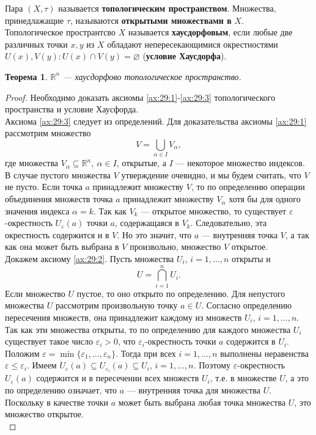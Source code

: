 \documentclass[12pt]{report}
\numberwithin{equation}{section}
\newtheorem{theorem}{Теорема}[section]
\begin{document}
Пара $(X, \tau)$ называется \textbf{топологическим пространством}. Множества, принедлажащие $\tau$, называются \textbf{открытыми множествами в} $X$.\\

Топологическое пространтсво $X$ называется \textbf{хаусдорфовым}, если любые две различных точки $x, y$ из $X$ обладают непересекающимися окрестностями $U(x),V(y): U(x) \cap V(y) = \varnothing$ (\textbf{условие Хаусдорфа}).

\begin{theorem} \label{th:29:1}
$\mathbb{R}^n$ --- хаусдорфово топологическое пространство.
\end{theorem}
\begin{proof}
Необходимо доказать аксиомы \ref{ax:29:1}-\ref{ax:29:3} топологического пространства и условие Хаусфорда.\\

Аксиома \ref{ax:29:3} следует из определений. Для доказательства аксиомы \ref{ax:29:1} рассмотрим множество
\[ V = \bigcup\limits_{\alpha \in I} V_{\alpha},\]
где множества $V_{\alpha} \subseteq \mathbb{R}^n,~\alpha \in I$, открытые, а $I$ --- некоторое множество индексов. В случае пустого множества $V$ утверждение очевидно, и мы будем считать, что $V$ не пусто. Если точка $a$ принадлежит множеству $V$, то по определению операции объединения множеств точка $a$ принадлежит множеству $V_{\alpha}$ хотя бы для одного значения индекса $\alpha = k$. Так как $V_k$ --- открытое множество, то существует $\varepsilon$-окрестность $U_{\varepsilon}(a)$ точки $a$, содержащаяся в $V_k$. Следовательно, эта окрестность содержится и в $V$. Но это значит, что $a$ --- внутренняя точка $V$, а так как она может быть выбрана в $V$ произвольно, множество $V$ открытое.\\

Докажем аксиому \ref{ax:29:2}. Пусть множества $U_i$, $i = 1, \ldots, n$ открыты и
\[ U = \bigcap\limits_{i = 1}^n U_i.\]
Если множество $U$ пустое, то оно открыто по определению. Для непустого множества $U$ рассмотрим произвольную точку $a \in U$. Согласно определению пересечения множеств, она принадлежит каждому из множеств $U_i$, $i = 1, \ldots, n$. Так как эти множества открыты, то по определению для каждого множества $U_i$ существует такое число $\varepsilon_i > 0$, что $\varepsilon_i$-окрестность точки $a$ содержится в $U_i$. Положим $\varepsilon = \min \{ \varepsilon_1, \ldots, \varepsilon_n \} $. Тогда при всех $i = 1, \ldots, n$ выполнены неравенства $\varepsilon \leqslant \varepsilon_i$. Имеем $U_{\varepsilon}(a) \subseteq U_{\varepsilon_i}(a) \subseteq U_i$, $i = 1, \ldots, n$. Поэтому $\varepsilon$-окрестность $U_{\varepsilon}(a)$ содержится и в пересечении всех множеств $U_i$, т.е. в множестве $U$, а это по определению означает, что $a$ --- внутренняя точка для множества $U$. Поскольку в качестве точки $a$ может быть выбрана любая точка множества $U$, это множество открытое.\\


\end{proof}
\end{document}
